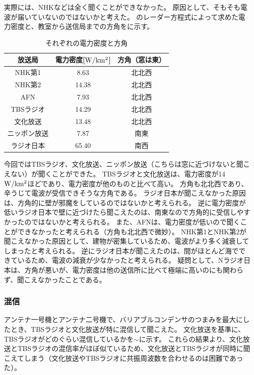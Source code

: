 \documentclass[report.tex]{subfiles}
\begin{document}
実際には、NHKなどは全く聞くことができなかった。
原因として、そもそも電波が届いていないのではないかと考えた。
のレーダー方程式によって求めた電力密度と、教室から送信局までの方角をに示す。

\begin{table}[H]
	\centering
	\caption{それぞれの電力密度と方角}
	\label{tab:aaa}
	\begin{tabular}{ccc} \hline
		放送局    & 電力密度[\(\rm{W/km^2}\)] & 方角（窓は東） \\ \hline
		NHK第1  & 8.63                  & 北北西     \\
		NHK第2  & 14.38                 & 北北西     \\
		AFN    & 7.93                  & 北北西     \\
		TBSラジオ & 14.29                 & 北北西     \\
		文化放送   & 13.48                 & 北北西     \\
		ニッポン放送 & 7.87                  & 南東      \\
		ラジオ日本  & 65.40                 & 南西      \\ \hline
	\end{tabular}
\end{table}

今回ではTBSラジオ、文化放送、ニッポン放送（こちらは窓に近づけないと聞こえない）が聞くことができた。
TBSラジオと文化放送は、電力密度が14 \(\rm{W/km^2}\)ほどであり、電力密度が他のものと比べて高い。
方角も北北西であり、辛うじて電波が受信できそうな方角である。
ラジオ日本が聞こえなかった原因は、方角的に壁が邪魔をしているのではないかと考えられる。
逆に電力密度が低いラジオ日本で壁に近づけたら聞こえたのは、南東なので方角的に受信しやすかったのではないかと考えられる。
また、AFNは、電力密度が低いので聞くことができなかったと考えられる（方角も北北西で微妙）。
NHK第1とNHK第2が聞こえなかった原因として、建物が密集しているため、電波がより多く減衰してしまったと考えられる。
逆にラジオ日本が聞こえたのは、間がほとんど海でできているため、電波の減衰が少なかったと考えられる。
疑問として、Nラジオ日本は、方角が悪いが、電力密度は他の送信所に比べて極端に高いのにも関わらず、聞こえなかったことである。

\subsubsection{混信}

アンテナ一号機とアンテナ二号機で、バリアブルコンデンサのつまみを最大にしたとき、TBSラジオと文化放送が特に混信して聞こえた。
文化放送を基準に、TBSラジオがどのぐらい混信しているかを\(\sim\)に示す。
これらの結果より、文化放送とTBSラジオの混信率がほぼ似ているため、文化放送とTBSラジオが同時に聞こえてしまう（文化放送やTBSラジオに共振周波数を合わせるのは困難であった）。
\end{document}

